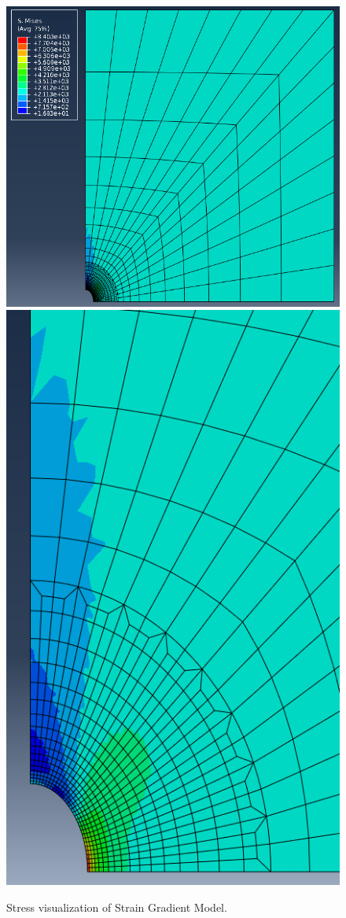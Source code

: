 \documentclass[12pt]{article}
\begin{document}
\begin{figure}[H]
	\begin{center}
		\includegraphics[scale=0.4]{MY_code_result_stress.png} \quad
		\includegraphics[scale=0.32]{MY_code_result_stress_crp.png}
	\end{center}  
   \caption{Stress visualization of Strain Gradient Model.}
\end{figure}
\end{document}
